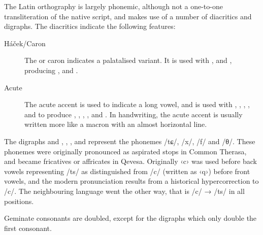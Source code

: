\documentclass[grammar]{subfiles}
\begin{document}

The Latin orthography is largely phonemic, although not a one-to-one
transliteration of the native script, and makes use of a number of diacritics
and digraphs.  The diacritics indicate the following features:

\begin{description}
  \item[Háček/Caron] The  or caron indicates a palatalised
    variant.  It is used with ,  and , producing , 
    and .
  \item[Acute] The acute accent is used to indicate a long vowel, and is used
    with , , , ,  and  to produce , , ,
    ,  and .  In handwriting, the acute accent is usually written more
    like a macron with an almost horizontal line. 
\end{description}

The digraphs  and , , , and  represent the
phonemes /tɕ/, /x/, /f/ and /θ/.  These phonemes were originally pronounced as
aspirated stops in Common Therasa, and became fricatives or affricates in
Qevesa.  Originally ‹c› was used before back vowels representing /ts/ as
distinguished from /c/ (written as ‹q›) before front vowels, and the modern
pronunciation results from a historical hypercorrection to /c/.  The
neighbouring language  went the other way, that is /c/ → /ts/ in all
positions.

Geminate consonants are doubled, except for the digraphs which only double the
first consonant.  
\end{document}
